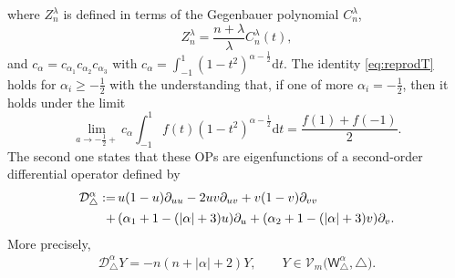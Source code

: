 \documentclass{amsart}
\theoremstyle{remark}
\def\la{{\langle}}
\def\ra{{\rangle}}
\def\d{\mathrm{d}}
\def\sh{{\mathsf h}}
\def\sT{{\mathsf T}}
\def\sW{{\mathsf W}}
\def\a{{\alpha}}
\def\b{{\beta}}
\def\g{{\gamma}}
\def\l{{\lambda}}
\def\la{{\langle}}
\def\ra{{\rangle}}
\def\CD{{\mathcal D}}
\def\CV{{\mathcal V}}
\def\f{\frac}
\begin{document}
where $Z_n^\l$ is defined in terms of the Gegenbauer polynomial $C_n^\l$, 
\begin{equation}\label{eq:Zn}
  Z_n^\l =  \frac{n + \l} {\l} C_n^\l (t),
\end{equation}
and $c_\a = c_{\a_1} c_{\a_2} c_{\a_3}$ with $c_\a = \int_{-1}^1 (1-t^2)^{\a-\f12} \d t$. The identity \eqref{eq:reprodT} holds 
for $\a_i \ge -\f12$ with the understanding that, if one of more $\a_i = -\f12$, then it holds under the limit
\begin{equation}\label{eq:limit}
   \lim_{a \to -\f12 +} c_\a \int_{-1}^1 f(t) (1-t^2)^{\a-\f12} \d t = \frac{f(1) + f(-1)}2.
\end{equation}
The second one states that these OPs are eigenfunctions of a second-order differential operator defined by 
\begin{align} \label{eq:CD-T}
  \CD^{\a}_\triangle:= \, & u(1-u) \partial_{uu} - 2 u v \partial_{uv} + v(1-v) \partial_{vv} \\
           + \, & (\a_1+1 - (|\a| + 3) u ) \partial_u +  (\a_2 + 1 -(|\a|+ 3) v) \partial_v.  \notag
\end{align}
More precisely, 
\begin{align}\label{eq:eigen-T}
    \CD^{\a}_\triangle Y  = -n (n+|\a| + 2) Y,  \qquad Y \in \CV_m\Big(\sW^{\a}_\triangle, \triangle\Big).
\end{align}

\end{document}
